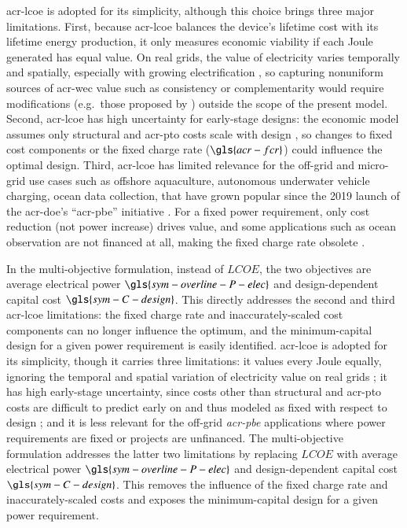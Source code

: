 \ifdefined\DISSERTATION
    \gls{acr-lcoe} is adopted for its simplicity, although this choice brings three major limitations.
    First, because \gls{acr-lcoe} balances the device's lifetime cost with its lifetime energy production, it only measures economic viability if each Joule generated has equal value.
    On real grids, the value of electricity varies temporally and spatially, especially with growing electrification \citep{akdemir_opportunities_2023,bhattacharya_timing_2021,pennock_temporal_2022},
    so capturing nonuniform sources of \gls{acr-wec} value such as consistency or complementarity would require modifications (e.g.\ those proposed by \citet{mccabe_system_2023}) outside the scope of the present model.
    Second, \gls{acr-lcoe} has high uncertainty for early-stage designs: the economic model assumes only structural and \gls{acr-pto} costs scale with design \citep{mccabe_development_2026}, so changes to fixed cost components or the fixed charge rate ($\gls{acr-fcr}$) could influence the optimal design.
    Third, \gls{acr-lcoe} has limited relevance for the off-grid and micro-grid use cases such as offshore aquaculture, autonomous underwater vehicle charging, ocean data collection, that have grown popular since the 2019 launch of the \gls{acr-doe}'s ``\gls{acr-pbe}'' initiative \citep{livecchi_powering_2019}.
    For a fixed power requirement, only cost reduction (not power increase) drives value, and some applications such as ocean observation are not financed at all, making the fixed charge rate obsolete \citep{jenne_powering_2021}.
    
    In the multi-objective formulation, instead of $LCOE$, the two objectives are average electrical power $\gls{sym-overline-P-elec}$ and design-dependent capital cost $\gls{sym-C-design}$.
    This directly addresses the second and third \gls{acr-lcoe} limitations: the fixed charge rate and inaccurately-scaled cost components can no longer influence the optimum, and the minimum-capital design for a given power requirement is easily identified.
\else
    \gls{acr-lcoe} is adopted for its simplicity, though it carries three limitations:
    it values every Joule equally, ignoring the temporal and spatial variation of electricity value on real grids \citep{akdemir_opportunities_2023,mccabe_system_2023};
    it has high early-stage uncertainty, since costs other than structural and \gls{acr-pto} costs are difficult to predict early on and thus modeled as fixed with respect to design \citep{mccabe_development_2026};
    and it is less relevant for the off-grid \emph{\gls{acr-pbe}} applications \citep{livecchi_powering_2019,jenne_powering_2021} where power requirements are fixed or projects are unfinanced.
    The multi-objective formulation addresses the latter two limitations by replacing $LCOE$ with average electrical power $\gls{sym-overline-P-elec}$ and design-dependent capital cost $\gls{sym-C-design}$.
    This removes the influence of the fixed charge rate and inaccurately-scaled costs and exposes the minimum-capital design for a given power requirement.
\fi

